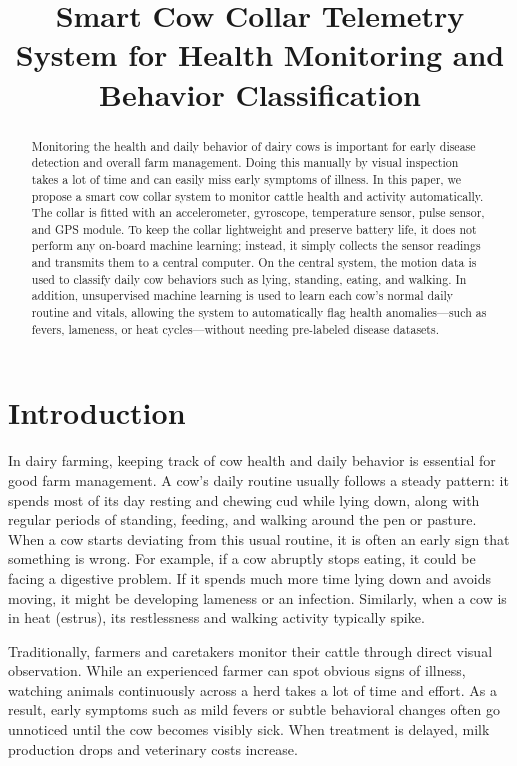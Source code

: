 \documentclass[conference]{IEEEtran}
\begin{document}
\title{Smart Cow Collar Telemetry System for Health Monitoring and Behavior Classification}

\maketitle

\begin{abstract}
Monitoring the health and daily behavior of dairy cows is important for early disease detection and overall farm management. Doing this manually by visual inspection takes a lot of time and can easily miss early symptoms of illness. In this paper, we propose a smart cow collar system to monitor cattle health and activity automatically. The collar is fitted with an accelerometer, gyroscope, temperature sensor, pulse sensor, and GPS module. To keep the collar lightweight and preserve battery life, it does not perform any on-board machine learning; instead, it simply collects the sensor readings and transmits them to a central computer. On the central system, the motion data is used to classify daily cow behaviors such as lying, standing, eating, and walking. In addition, unsupervised machine learning is used to learn each cow's normal daily routine and vitals, allowing the system to automatically flag health anomalies---such as fevers, lameness, or heat cycles---without needing pre-labeled disease datasets.
\end{abstract}

\section{Introduction}

In dairy farming, keeping track of cow health and daily behavior is essential for good farm management. A cow's daily routine usually follows a steady pattern: it spends most of its day resting and chewing cud while lying down, along with regular periods of standing, feeding, and walking around the pen or pasture. When a cow starts deviating from this usual routine, it is often an early sign that something is wrong. For example, if a cow abruptly stops eating, it could be facing a digestive problem. If it spends much more time lying down and avoids moving, it might be developing lameness or an infection. Similarly, when a cow is in heat (estrus), its restlessness and walking activity typically spike.

Traditionally, farmers and caretakers monitor their cattle through direct visual observation. While an experienced farmer can spot obvious signs of illness, watching animals continuously across a herd takes a lot of time and effort. As a result, early symptoms such as mild fevers or subtle behavioral changes often go unnoticed until the cow becomes visibly sick. When treatment is delayed, milk production drops and veterinary costs increase. 
\end{document}
